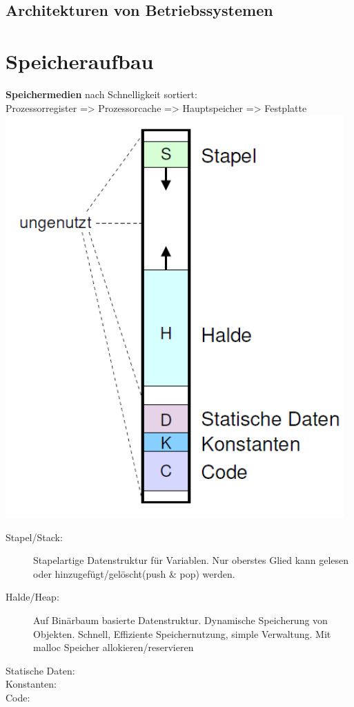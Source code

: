 \documentclass[12pt,a4paper]{article}
\begin{document}
\subsection{Architekturen von Betriebssystemen}
	
\section{Speicheraufbau}

	\textbf{Speichermedien} nach Schnelligkeit sortiert:\\
	Prozessorregister => Prozessorcache => Hauptspeicher => Festplatte\\

	\includegraphics[scale=0.8]{Bilder/Speicheraufbau.png}
	\begin{description}
		\item[Stapel/Stack:] Stapelartige Datenstruktur für Variablen. Nur oberstes Glied kann gelesen oder hinzugefügt/gelöscht(push \& pop) werden.
		\item[Halde/Heap:] Auf Binärbaum basierte Datenstruktur. Dynamische Speicherung von Objekten. Schnell, Effiziente Speichernutzung, simple Verwaltung. Mit malloc Speicher allokieren/reservieren
		\item[Statische Daten:] 
		\item[Konstanten:]
		\item[Code:] 
	\end{description}
\end{document}
